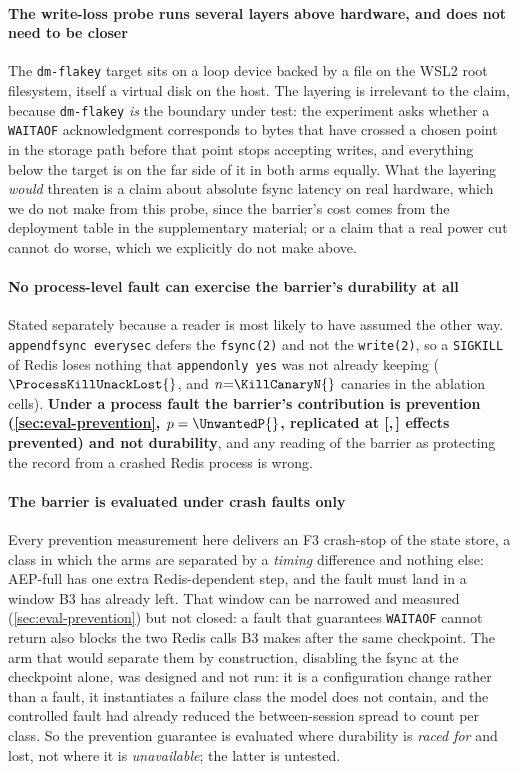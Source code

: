 \paragraph{The write-loss probe runs several layers above hardware, and does not
need to be closer} The \texttt{dm-flakey} target sits on a loop device backed by
a file on the WSL2 root filesystem, itself a virtual disk on the host. The
layering is irrelevant to the claim, because \texttt{dm-flakey} \emph{is} the
boundary under test: the experiment asks whether a \texttt{WAITAOF}
acknowledgment corresponds to bytes that have crossed a chosen point in the
storage path before that point stops accepting writes, and everything below the
target is on the far side of it in both arms equally. What the layering
\emph{would} threaten is a claim about absolute fsync latency on real hardware,
which we do not make from this probe, since the barrier's cost comes from
the deployment table in the supplementary material; or a claim that a
real power cut cannot do worse,
which we explicitly do not make above.

\paragraph{No process-level fault can exercise the barrier's durability at all}
Stated separately because a reader is most likely to have assumed the other way.
\texttt{appendfsync everysec} defers the \texttt{fsync(2)} and not the
\texttt{write(2)}, so a \texttt{SIGKILL} of Redis loses nothing that
\texttt{appendonly yes} was not already keeping ($\ProcessKillUnackLost{}$, and
$n{=}\KillCanaryN{}$ canaries in the ablation cells). \textbf{Under a process
fault the barrier's contribution is prevention (\cref{sec:eval-prevention},
$p=\UnwantedP{}$, replicated at
[\ReplicationPreventedLow{},\,\ReplicationPreventedHigh{}] effects prevented)
and not durability}, and any reading of the barrier as protecting the record
from a crashed Redis process is wrong.

\paragraph{The barrier is evaluated under crash faults only} Every prevention
measurement here delivers an F3 crash-stop of the state store, a class in which
the arms are separated by a \emph{timing} difference and nothing else: AEP-full
has one extra Redis-dependent step, and the fault must land in a window B3 has
already left. That window can be narrowed and measured
(\cref{sec:eval-prevention}) but not closed: a fault that guarantees
\texttt{WAITAOF} cannot return also blocks the two Redis calls B3 makes after
the same checkpoint. The arm that would separate them by construction,
disabling the fsync at the checkpoint alone, was designed and not run: it is
a configuration change rather than a fault, it instantiates a failure class the
model does not contain, and the controlled fault had already reduced the
between-session spread to \ArmASpreadMax{} count per class. So the prevention
guarantee is evaluated where durability is \emph{raced for} and lost, not where
it is \emph{unavailable}; the latter is untested.


